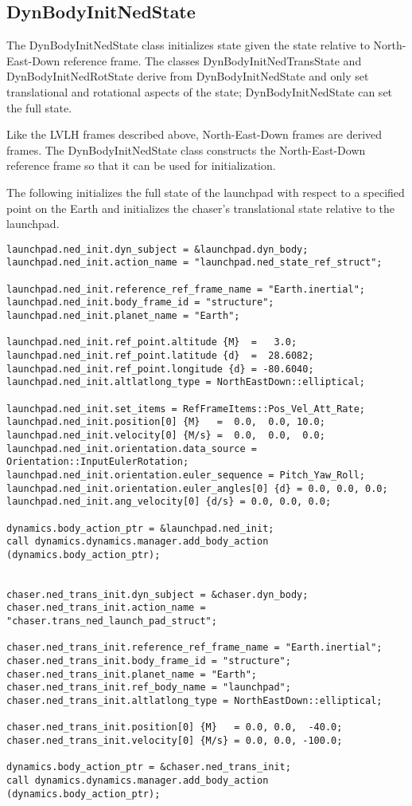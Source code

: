 \subsection{DynBodyInitNedState}

The DynBodyInitNedState class initializes state
given the state relative to North-East-Down reference frame.
The classes DynBodyInitNedTransState and DynBodyInitNedRotState
derive from DynBodyInitNedState and only set translational and
rotational aspects of the state; DynBodyInitNedState can set the
full state.

Like the LVLH frames described above,
North-East-Down frames are derived frames.
The DynBodyInitNedState class
constructs the North-East-Down reference frame
so that it can be used for initialization.

The following initializes the full state of the launchpad
with respect to a specified point on the Earth
and initializes the chaser's translational state relative to the launchpad.

\begin{verbatim}
launchpad.ned_init.dyn_subject = &launchpad.dyn_body;
launchpad.ned_init.action_name = "launchpad.ned_state_ref_struct";

launchpad.ned_init.reference_ref_frame_name = "Earth.inertial";
launchpad.ned_init.body_frame_id = "structure";
launchpad.ned_init.planet_name = "Earth";

launchpad.ned_init.ref_point.altitude {M}  =   3.0;
launchpad.ned_init.ref_point.latitude {d}  =  28.6082;
launchpad.ned_init.ref_point.longitude {d} = -80.6040;
launchpad.ned_init.altlatlong_type = NorthEastDown::elliptical;

launchpad.ned_init.set_items = RefFrameItems::Pos_Vel_Att_Rate;
launchpad.ned_init.position[0] {M}   =  0.0,  0.0, 10.0;
launchpad.ned_init.velocity[0] {M/s} =  0.0,  0.0,  0.0;
launchpad.ned_init.orientation.data_source = Orientation::InputEulerRotation;
launchpad.ned_init.orientation.euler_sequence = Pitch_Yaw_Roll;
launchpad.ned_init.orientation.euler_angles[0] {d} = 0.0, 0.0, 0.0;
launchpad.ned_init.ang_velocity[0] {d/s} = 0.0, 0.0, 0.0;

dynamics.body_action_ptr = &launchpad.ned_init;
call dynamics.dynamics.manager.add_body_action (dynamics.body_action_ptr);


chaser.ned_trans_init.dyn_subject = &chaser.dyn_body;
chaser.ned_trans_init.action_name = "chaser.trans_ned_launch_pad_struct";

chaser.ned_trans_init.reference_ref_frame_name = "Earth.inertial";
chaser.ned_trans_init.body_frame_id = "structure";
chaser.ned_trans_init.planet_name = "Earth";
chaser.ned_trans_init.ref_body_name = "launchpad";
chaser.ned_trans_init.altlatlong_type = NorthEastDown::elliptical;

chaser.ned_trans_init.position[0] {M}   = 0.0, 0.0,  -40.0;
chaser.ned_trans_init.velocity[0] {M/s} = 0.0, 0.0, -100.0;

dynamics.body_action_ptr = &chaser.ned_trans_init;
call dynamics.dynamics.manager.add_body_action (dynamics.body_action_ptr);
\end{verbatim}

